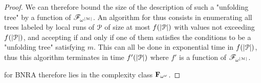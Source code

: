 \begin{proof}
	We can therefore bound the size of the description of such a "unfolding tree" by a function of $\mathscr{F}_{\omega^{|\mathcal{M}|}}$.
	An algorithm for \COVER thus consists in enumerating all trees labeled by local runs of $\mathcal{P}$ of size at most $f(|\mathcal{P}|)$ with values not exceeding $f(|\mathcal{P}|)$, and accepting if and only if one of them satisfies the conditions to be a "unfolding tree" satisfying $m$.
	This can all be done in exponential time in $f(|\mathcal{P}|)$, thus this algorithm terminates in time $f'(|\mathcal{P}|)$ where $f'$ is a function of $\mathscr{F}_{\omega^{|\mathcal{M}|}}$.
	
	\COVER for BNRA therefore lies in the complexity class $\mathbf{F}_{\omega^\omega}$.
\end{proof}
